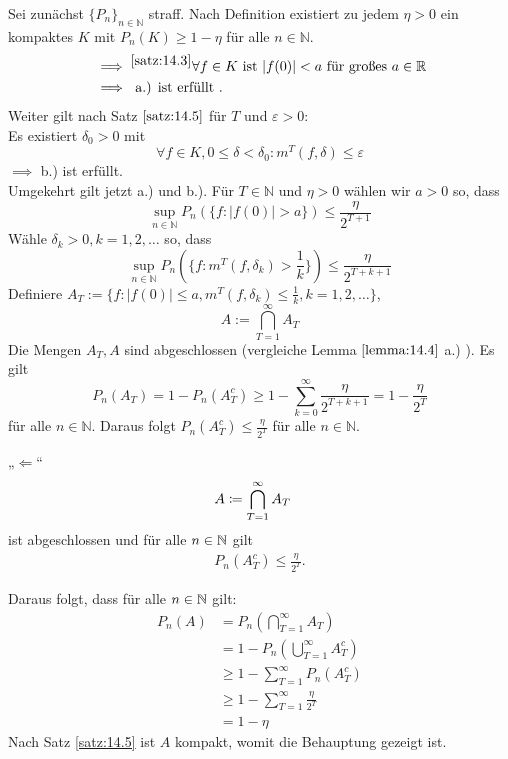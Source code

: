 \documentclass[a4paper,twoside,DIV15,BCOR12mm]{scrbook}
\begin{document}
  \begin{beweis}
    Sei zunächst $\{P_n\}_{n\in\mathbb N}$ straff. Nach Definition existiert zu jedem $\eta>0$ ein kompaktes $K$ mit $P_n(K)\geq 1-\eta$ für alle $n\in\mathbb N$. 
    \begin{align*}
      & \implies^{\ref{satz:14.3}} \forall f\in K \text{ ist }\vert f(0)\vert<a \text{ für großes }a\in\mathbb R \\
& \implies \text{ a.) ist erfüllt }.
    \end{align*}
Weiter gilt nach Satz $\ref{satz:14.5}$ für $T$ und $\varepsilon>0$: \\
Es existiert $\delta_0>0$ mit
\[
\forall f\in K,0\leq\delta<\delta_0:m^T(f,\delta)\leq\varepsilon
\]
$\implies$ b.) ist erfüllt. \\
Umgekehrt gilt jetzt a.) und b.). Für $T\in\mathbb N$ und $\eta>0$ wählen wir $a>0$ so, dass
\[
\sup_{n\in\mathbb N}P_n(\{f:\vert f(0)\vert>a\})\leq\frac{\eta}{2^{T+1}}
\]
Wähle $\delta_k>0, k=1,2,\dots$ so, dass
\[
\sup_{n\in\mathbb N}P_n(\{f:m^T(f,\delta_k)>\frac{1}{k}\})\leq\frac{\eta}{2^{T+k+1}}
\]
Definiere $A_T:=\{f:\vert f(0)\vert\leq a,m^T(f,\delta_k)\leq\frac{1}{k},k=1,2,\dots \}$,
\[
A:=\bigcap_{T=1}^\infty A_T
\]
Die Mengen $A_T,A$ sind abgeschlossen (vergleiche Lemma $\ref{lemma:14.4}$ a.) ). Es gilt
\[
P_n(A_T)=1-P_n(A_T^c)\geq1-\sum_{k=0}^\infty\frac{\eta}{2^{T+k+1}}=1-\frac{\eta}{2^T}
\]
für alle $n\in\mathbb N$. Daraus folgt $P_n(A_T^c)\leq\frac{\eta}{2^T}$ für alle $n\in\mathbb N$.

„$\Longleftarrow$“
\begin{align*}
A &\da \bigcap_{T=1}^\infty A_T
\end{align*}
ist abgeschlossen und für alle $n\in\mathbb{N}$ gilt
\begin{align*}
P_n(A_T^{c}) \le \frac\eta{2^T}.
\end{align*}

Daraus folgt, dass  für alle $n\in \mathbb{N}$ gilt:
\begin{align*}
P_n(A) &= P_n(\bigcap_{T=1}^\infty A_T)\\
&= 1-P_n(\bigcup_{T=1}^\infty A_T^c) \\
&\ge 1 - \sum_{T=1}^\infty P_n(A_T^c) \\
&\ge 1 - \sum_{T=1}^\infty \frac\eta{2^T} \\
&=1-\eta
\end{align*}
Nach Satz \ref{satz:14.5} ist $A$ kompakt, womit die Behauptung gezeigt ist.
\end{beweis}
\end{document}
